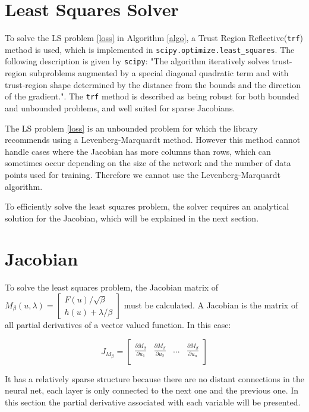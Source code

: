 \section{Least Squares Solver}
To solve the LS problem \ref{loss} in Algorithm \ref{algo}, a Trust Region Reflective(\texttt{trf}) method is used, which is implemented in \texttt{scipy.optimize.least\_squares}. The following description is given by \texttt{scipy}: "The algorithm iteratively solves trust-region subproblems augmented by a special diagonal quadratic term and with trust-region shape determined by the distance from the bounds and the direction of the gradient."\cite{scipyls}. The \texttt{trf} method is described as being robust for both bounded and unbounded problems, and well suited for sparse Jacobians. 

The LS problem \ref{loss} is an unbounded problem for which the library recommends using a Levenberg-Marquardt method. However this method cannot handle cases where the Jacobian has more columns than rows, which can sometimes occur depending on the size of the network and the number of data points used for training. Therefore we cannot use the Levenberg-Marquardt algorithm.

To efficiently solve the least squares problem, the solver requires an analytical solution for the Jacobian, which will be explained in the next section.

\section{Jacobian}

To solve the least squares problem, the Jacobian matrix of $M_{\beta}(u,\lambda) = \begin{bmatrix} F(u)/\sqrt{\beta} \\ h(u) + \lambda/\beta \end{bmatrix}$ must be calculated. A Jacobian is the matrix of all partial derivatives of a vector valued function. In this case:

\begin{equation}
J_{M_{\beta}} = 
\begin{bmatrix}
\frac{\partial{M_{\beta}}}{\partial u_1} & 
\frac{\partial{M_{\beta}}}{\partial u_2} & ... & 
\frac{\partial{M_{\beta}}}{\partial u_n} \\
\end{bmatrix}
\end{equation}

 It has a relatively sparse structure because there are no distant connections in the neural net, each layer is only connected to the next one and the previous one. In this section the partial derivative associated with each variable will be presented.
 
